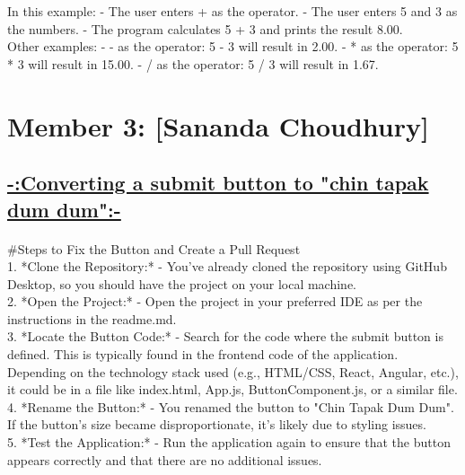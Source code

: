 \documentclass[a4paper,12pt]{article}
\begin{document}
In this example:
- The user enters + as the operator.
- The user enters 5 and 3 as the numbers.
- The program calculates 5 + 3 and prints the result 8.00.\\

Other examples:
- - as the operator: 5 - 3 will result in 2.00.
- * as the operator: 5 * 3 will result in 15.00.
- / as the operator: 5 / 3 will result in 1.67.

\newpage

\section*{Member 3: [Sananda Choudhury]}
\date{\today}
\FloatBarrier 
\begin{center}
\section*{\uline{-:Converting a submit button to "chin tapak dum dum":-}}
\end{center}
\paragraph{}

#Steps to Fix the Button and Create a Pull Request\\

1. *Clone the Repository:*
   - You’ve already cloned the repository using GitHub Desktop, so you should have the project on your local machine.\\

2. *Open the Project:*
   - Open the project in your preferred IDE as per the instructions in the readme.md.\\

3. *Locate the Button Code:*
   - Search for the code where the submit button is defined. This is typically found in the frontend code of the application. Depending on the technology stack used (e.g., HTML/CSS, React, Angular, etc.), it could be in a file like index.html, App.js, ButtonComponent.js, or a similar file.\\

4. *Rename the Button:*
   - You renamed the button to "Chin Tapak Dum Dum". If the button’s size became disproportionate, it’s likely due to styling issues.\\

5. *Test the Application:*
   - Run the application again to ensure that the button appears correctly and that there are no additional issues.\\
\end{document}
